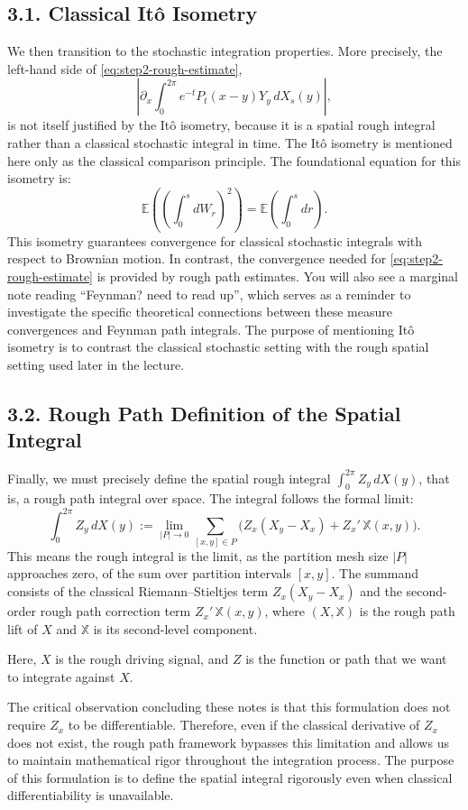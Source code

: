 \documentclass[11pt]{article}
\theoremstyle{definition}
\theoremstyle{remark}
\begin{document}
\subsection*{3.1. Classical It\^o Isometry}
We then transition to the stochastic integration properties. More precisely, the left-hand side of \eqref{eq:step2-rough-estimate},
\[
\left|\partial_x\int_0^{2\pi} e^{-t}P_t(x-y)Y_y\,dX_s(y)\right|,
\]
is not itself justified by the It\^o isometry, because it is a spatial rough integral rather than a classical stochastic integral in time. The It\^o isometry is mentioned here only as the classical comparison principle. The foundational equation for this isometry is:
\[
\mathbb E\!\left(\left(\int_0^s dW_r\right)^2\right)=\mathbb E\!\left(\int_0^s dr\right).
\]
This isometry guarantees convergence for classical stochastic integrals with respect to Brownian motion. In contrast, the convergence needed for \eqref{eq:step2-rough-estimate} is provided by rough path estimates. You will also see a marginal note reading ``Feynman? need to read up'', which serves as a reminder to investigate the specific theoretical connections between these measure convergences and Feynman path integrals.
The purpose of mentioning It\^o isometry is to contrast the classical stochastic setting with the rough spatial setting used later in the lecture.

\subsection*{3.2. Rough Path Definition of the Spatial Integral}
Finally, we must precisely define the spatial rough integral $\int_0^{2\pi} Z_y\,dX(y)$, that is, a rough path integral over space. The integral follows the formal limit:
\[
\int_0^{2\pi} Z_y\,dX(y)
:=
\lim_{|P|\to0}
\sum_{[x,y]\in P}
\bigl(Z_x(X_y-X_x)+Z_x'\,\mathbb X(x,y)\bigr).
\]
This means the rough integral is the limit, as the partition mesh size $|P|$ approaches zero, of the sum over partition intervals $[x,y]$. The summand consists of the classical Riemann--Stieltjes term $Z_x(X_y-X_x)$ and the second-order rough path correction term $Z_x'\,\mathbb X(x,y)$, where $(X,\mathbb X)$ is the rough path lift of $X$ and $\mathbb X$ is its second-level component.

Here, $X$ is the rough driving signal, and $Z$ is the function or path that we want to integrate against $X$.

The critical observation concluding these notes is that this formulation does not require $Z_x$ to be differentiable. Therefore, even if the classical derivative of $Z_x$ does not exist, the rough path framework bypasses this limitation and allows us to maintain mathematical rigor throughout the integration process.
The purpose of this formulation is to define the spatial integral rigorously even when classical differentiability is unavailable.
\end{document}
